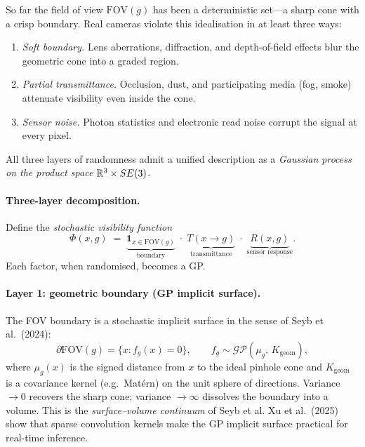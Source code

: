 So far the field of view $\mathrm{FOV}(g)$ has been a deterministic
set---a sharp cone with a crisp boundary.  Real cameras violate this
idealisation in at least three ways:
\begin{enumerate}[label=(\roman*),nosep]
  \item \emph{Soft boundary.}  Lens aberrations, diffraction, and
  depth-of-field effects blur the geometric cone into a graded
  region.
  \item \emph{Partial transmittance.}  Occlusion, dust, and
  participating media (fog, smoke) attenuate visibility even inside
  the cone.
  \item \emph{Sensor noise.}  Photon statistics and electronic read
  noise corrupt the signal at every pixel.
\end{enumerate}
All three layers of randomness admit a unified description as a
\emph{Gaussian process on the product space}
$\mathbb{R}^3 \times SE(3)$.

\paragraph{Three-layer decomposition.}
Define the \emph{stochastic visibility function}
\begin{equation}\label{eq:m-fov-product}
  \Phi(x, g)
  \;=\;
  \underbrace{\mathbf{1}_{x \in \mathrm{FOV}(g)}}_{\text{boundary}}
  \;\cdot\;
  \underbrace{T(x \to g)}_{\text{transmittance}}
  \;\cdot\;
  \underbrace{R(x, g)}_{\text{sensor response}}.
\end{equation}
Each factor, when randomised, becomes a GP.

\paragraph{Layer 1: geometric boundary (GP implicit surface).}
The FOV boundary is a stochastic implicit surface in the sense of
Seyb et al.~(2024):
\begin{equation}\label{eq:m-gp-boundary}
  \partial\mathrm{FOV}(g)
  = \{x : f_g(x) = 0\},
  \qquad
  f_g \sim \mathcal{GP}(\mu_g,\, K_{\mathrm{geom}}),
\end{equation}
where $\mu_g(x)$ is the signed distance from $x$ to the ideal
pinhole cone and $K_{\mathrm{geom}}$ is a covariance kernel
(e.g.\ Mat\'ern) on the unit sphere of directions.  Variance
$\to 0$ recovers the sharp cone; variance $\to \infty$ dissolves
the boundary into a volume.  This is the \emph{surface--volume
continuum} of Seyb et al.  Xu et al.~(2025) show that sparse
convolution kernels make the GP implicit surface practical for
real-time inference.

